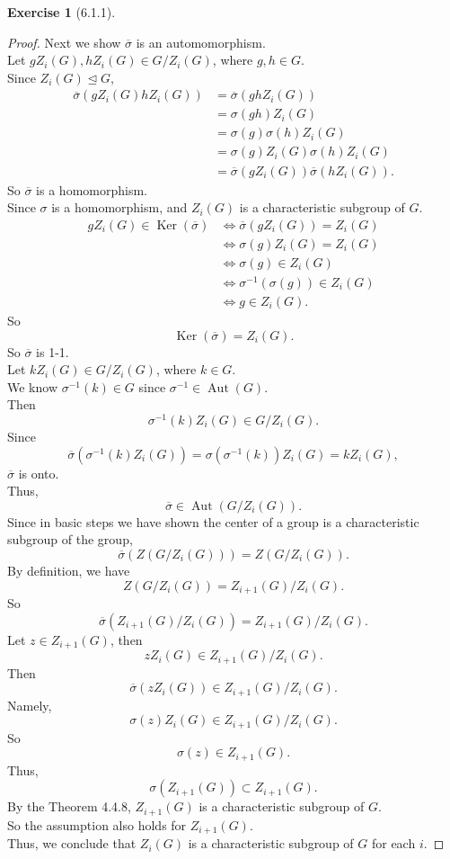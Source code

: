 \documentclass{amsart}
\renewcommand{\ker}{\operatorname{Ker}}
\theoremstyle{plain}
\theoremstyle{definition}
\newtheorem{exer}[lem]{Exercise}
\begin{document}
\begin{exer}[6.1.1]
\begin{proof}
	Next we show $\overline{\sigma}$ is an automomorphism.\\
	Let $gZ_i(G), hZ_i(G) \in G/Z_i(G)$, where $g,h\in G$.\\
	Since $Z_i(G) \unlhd G$,
	\begin{align*}
	  \overline{\sigma}(gZ_i(G)hZ_i(G)) &= \overline{\sigma}(ghZ_i(G))\\
	  								 	&= \sigma(gh)Z_i(G)\\
	  									&=\sigma(g)\sigma(h)Z_i(G) \\
	  									&= \sigma(g)Z_i(G)\sigma(h)Z_i(G) \\
	  									&= \overline{\sigma}(gZ_i(G)) \overline{\sigma}(hZ_i(G)).
  	\end{align*}
  	So $\overline{\sigma}$ is a homomorphism.\\
  	Since $\sigma$ is a homomorphism, and $Z_i(G)$ is a characteristic subgroup of $G$.
  	\begin{align*}
  	gZ_i(G) \in \ker\left(\overline{\sigma}\right) &\Leftrightarrow \overline{\sigma}(gZ_i(G)) = Z_i(G) \\
  												   &\Leftrightarrow \sigma(g)Z_i(G) = Z_i(G) \\
  	  											   &\Leftrightarrow \sigma(g) \in Z_i(G) \\
  	  											   &\Leftrightarrow \sigma^{-1}(\sigma(g)) \in Z_i(G) \\
  	  											   &\Leftrightarrow g \in Z_i(G).
  	\end{align*}
	So
	\[\ker(\overline{\sigma}) = Z_i(G).\]
	So $\overline{\sigma}$ is 1-1.\\
	Let $kZ_i(G) \in G/Z_i(G)$, where $k \in G$.\\
	We know $\sigma^{-1}(k) \in G$ since $\sigma^{-1} \in \operatorname{Aut}(G)$.\\
	Then 
	\[\sigma^{-1}(k) Z_i(G) \in G/Z_i(G).\]
	Since 
	\[\overline{\sigma} \left(\sigma^{-1}(k)Z_i(G)\right) = \sigma(\sigma^{-1}(k)) Z_i(G) = kZ_i(G),\]
	$\overline{\sigma}$ is onto.\\
	Thus, 
	\[\overline{\sigma} \in \operatorname{Aut}\left(G/Z_i(G)\right).\]
	Since in basic steps we have shown the center of a group is a characteristic subgroup of the group,\\
	\[\overline{\sigma}\left(Z\left(G/Z_i(G)\right)\right) = Z\left(G/Z_i(G)\right). \]
	By definition, we have 
	\[Z\left(G/Z_i(G)\right)  = Z_{i+1}(G)/Z_i(G).\]
	So
  	\[\overline{\sigma}\left( Z_{i+1}(G)/Z_i(G) \right) = Z_{i+1}(G)/Z_i(G). \]
	Let $z \in Z_{i+1}(G)$, then 
		\[zZ_i(G) \in Z_{i+1}(G)/Z_i(G).\]
	Then
	\[\overline{\sigma}( zZ_i(G)) \in Z_{i+1}(G)/Z_i(G). \]
	Namely,
	\[\sigma(z)Z_i(G) \in  Z_{i+1}(G)/Z_i(G).\]
	So 
  	\[\sigma(z) \in Z_{i+1}(G).\]
	Thus,
  	\[\sigma\left(Z_{i+1}(G)\right) \subset Z_{i+1}(G).\]
	By the Theorem 4.4.8, $Z_{i+1}(G)$ is a characteristic subgroup of $G$.\\
	So the assumption also holds for $Z_{i+1}(G)$.\\
	Thus, we conclude that $Z_i(G)$ is a characteristic subgroup of $G$ for each $i$.
 \end{proof}
\end{exer}
\end{document}
